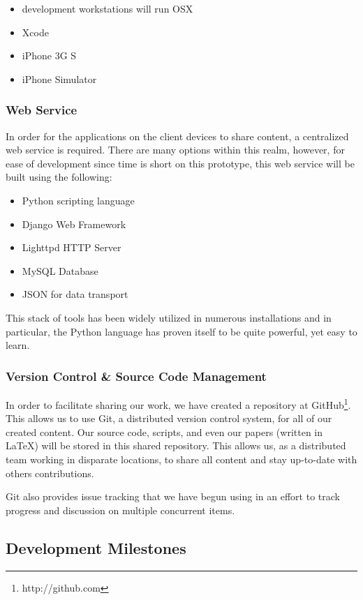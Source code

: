 \documentclass{article}
\begin{document}
\begin{itemize}
\item development workstations will run OSX
\item Xcode
\item iPhone 3G S
\item iPhone Simulator
\end{itemize}

\subsubsection{ Web Service }

In order for the applications on the client devices to share content, a
centralized web service is required.  There are many options within this realm,
however, for ease of development since time is short on this prototype, this
web service will be built using the following:

\begin{itemize}
\item Python scripting language
\item Django Web Framework
\item Lighttpd HTTP Server
\item MySQL Database
\item JSON for data transport
\end{itemize}

This stack of tools has been widely utilized in numerous installations and in
particular, the Python language has proven itself to be quite powerful, yet
easy to learn.

\subsubsection{ Version Control \& Source Code Management }

In order to facilitate sharing our work, we have created a repository at
GitHub\footnote{http://github.com}.  This allows us to use Git, a distributed
version control system, for all of our created content.  Our source code,
scripts, and even our papers (written in \LaTeX) will be stored in this shared
repository.  This allows us, as a distributed team working in disparate
locations, to share all content and stay up-to-date with others contributions.

Git also provides issue tracking that we have begun using in an effort to track
progress and discussion on multiple concurrent items.

\subsection{ Development Milestones  }
\end{document}
